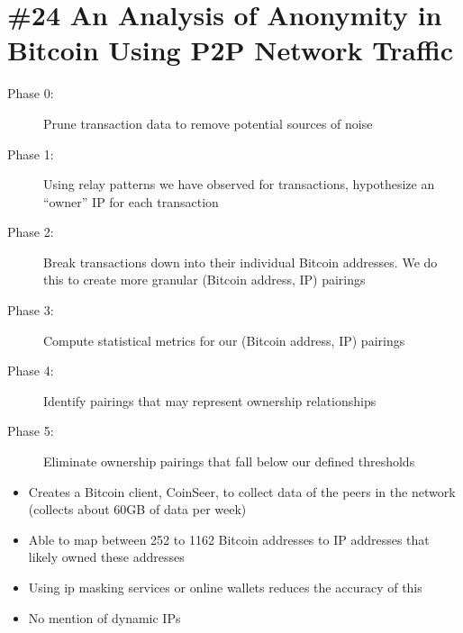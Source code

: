 \section{\#24 An Analysis of Anonymity in Bitcoin Using P2P Network Traffic}
\begin{description}
	\item[Phase 0:] Prune transaction data to remove potential sources of noise
	\item[Phase 1:] Using relay patterns we have observed for transactions, hypothesize an ``owner'' IP for each transaction
	\item[Phase 2:] Break transactions down into their individual Bitcoin addresses. We do this to create more granular (Bitcoin address, IP) pairings
	\item[Phase 3:] Compute statistical metrics for our (Bitcoin address, IP) pairings
	\item[Phase 4:] Identify pairings that may represent ownership relationships
	\item[Phase 5:] Eliminate ownership pairings that fall below our defined thresholds
\end{description}
\begin{itemize}
	\item Creates a Bitcoin client, CoinSeer, to collect data of the peers in the network (collects about 60GB of data per week)
	\item Able to map between 252 to 1162 Bitcoin addresses to IP addresses that likely owned these addresses
	\item Using ip masking services or online wallets reduces the accuracy of this
	\item No mention of dynamic IPs
\end{itemize}